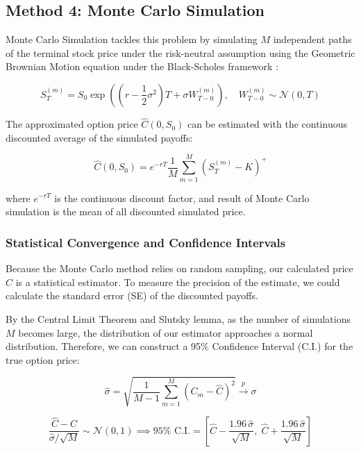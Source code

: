 \documentclass[a4paper,11pt, titlepage]{article}
\theoremstyle{definition}
\theoremstyle{plain}
\theoremstyle{remark}
\begin{document}
\subsection{Method 4: Monte Carlo Simulation}

Monte Carlo Simulation tackles this problem by simulating $M$ independent paths of the terminal stock price under the risk-neutral assumption using the Geometric Brownian Motion equation under the Black-Scholes framework \cite{black1973}:

\begin{equation}
    S_T^{(m)} = S_0 \exp \left( \left( r - \frac{1}{2}\sigma^2 \right) T + \sigma W_{T-0}^{(m)} \right), \quad W_{T-0}^{(m)} \sim \mathcal{N}(0,T)
\end{equation}

The approximated option price $\hat{C}(0, S_0)$ can be estimated with the continuous discounted average of the simulated payoffs:

\begin{equation}
    \hat{C}(0, S_0) = e^{-rT} \frac{1}{M} \sum_{m=1}^{M} (S_T^{(m)} - K)^+
\end{equation}

where $e^{-rT}$ is the continuous discount factor, and result of Monte Carlo simulation is the mean of all discounted simulated price.

\subsubsection{Statistical Convergence and Confidence Intervals}

Because the Monte Carlo method relies on random sampling, our calculated price $\hat{C}$ is a statistical estimator. To measure the precision of the estimate, we could calculate the standard error (SE) of the discounted payoffs.

By the Central Limit Theorem and Slutsky lemma, as the number of simulations $M$ becomes large, the distribution of our estimator approaches a normal distribution. Therefore, we can construct a 95\% Confidence Interval (C.I.) for the true option price:

\begin{equation}
    \hat{\sigma} = \sqrt{\frac{1}{M-1}\sum_{m=1}^{M} \left(C_m - \hat{C}\right)^2} \overset{p}{\longrightarrow} \sigma
\end{equation}

\begin{equation}
    \frac{\hat{C} - C}{\hat{\sigma}/\sqrt{M}} \sim \mathcal{N}(0, 1) \implies 95\% \text{ C.I.} = \left[ \hat{C} - \frac{1.96\,\hat{\sigma}}{\sqrt{M}}, \; \hat{C} + \frac{1.96\,\hat{\sigma}}{\sqrt{M}} \right]
\end{equation}
\end{document}
